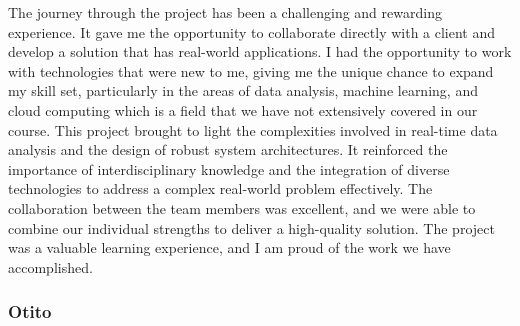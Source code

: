 The journey through the project has been a challenging and rewarding experience. It gave me the opportunity to collaborate directly with a client and develop 
a solution that has real-world applications. I had the opportunity to work with technologies that were new to me, giving me the unique chance to expand my skill 
set, particularly in the areas of data analysis, machine learning, and cloud computing which is a field that we have not extensively covered in our course.  
This project brought to light the complexities involved in real-time data analysis and the design of robust system architectures. It reinforced the
importance of interdisciplinary knowledge and the integration of diverse technologies to address a complex real-world problem effectively. 
The collaboration between the team members was excellent, and we were able to combine our individual strengths to deliver a high-quality solution. 
The project was a valuable learning experience, and I am proud of the work we have accomplished.



\subsubsection*{Otito}